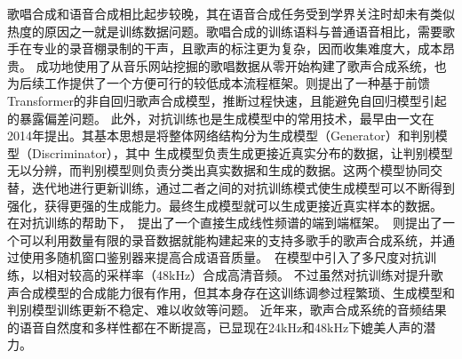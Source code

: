 歌唱合成和语音合成相比起步较晚，其在语音合成任务受到学界关注时却未有类似热度的原因之一就是训练数据问题。歌唱合成的训练语料与普通语音相比，需要歌手在专业的录音棚录制的干声，且歌声的标注更为复杂，因而收集难度大，成本昂贵。
\citet{ren2020deepsinger}成功地使用了从音乐网站挖掘的歌唱数据从零开始构建了歌声合成系统，也为后续工作提供了一个方便可行的较低成本流程框架。\citet{blaauw2020sequence}则提出了一种基于前馈Transformer的非自回归歌声合成模型，推断过程快速，且能避免自回归模型引起的暴露偏差问题。
此外，对抗训练也是生成模型中的常用技术，最早由\citet{GAN}一文在2014年提出。其基本思想是将整体网络结构分为生成模型（Generator）和判别模型（Discriminator），其中
生成模型负责生成更接近真实分布的数据，让判别模型无以分辨，而判别模型则负责分类出真实数据和生成的数据。这两个模型协同交替，迭代地进行更新训练，通过二者之间的对抗训练模式使生成模型可以不断得到强化，获得更强的生成能力。最终生成模型就可以生成更接近真实样本的数据。
在对抗训练的帮助下，\citet{lee2019adversarially}~提出了一个直接生成线性频谱的端到端框架。\citet{wu2020adversarially}~则提出了一个可以利用数量有限的录音数据就能构建起来的支持多歌手的歌声合成系统，并通过使用多随机窗口鉴别器来提高合成语音质量。\citet{chen2020hifisinger}~在模型中引入了多尺度对抗训练，以相对较高的采样率（48kHz）合成高清音频。
不过虽然对抗训练对提升歌声合成模型的合成能力很有作用，但其本身存在这训练调参过程繁琐、生成模型和判别模型训练更新不稳定、难以收敛等问题。
近年来，歌声合成系统的音频结果的语音自然度和多样性都在不断提高，已显现在24kHz和48kHz下媲美人声的潜力。
